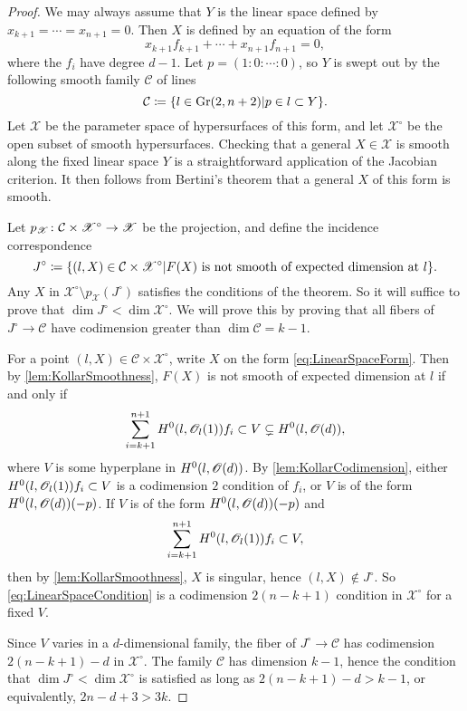 \begin{proof}
	We may always assume that $Y$ is the linear space defined by $x_{k+1} = \cdots = x_{n+1} = 0$. Then  $X$ is defined by an equation of the form 
	\begin{equation}
		\label{eq:LinearSpaceForm}
		x_{k+1}f_{k+1} + \cdots + x_{n+1}f_{n+1} = 0,
	\end{equation}
	where the $f_i$ have degree $d-1$. Let $p = (1:0:\cdots:0)$, so $Y$ is swept out by the following smooth family $\mathcal{C}$ of lines
	\[\mathcal{C} \coloneqq \lbrace l \in \operatorname{Gr}(2,n+2) \vert p \in l \subset Y\rbrace.\]
Let $\mathscr{X}$ be the parameter space of hypersurfaces of this form, and let $\mathscr{X}^\circ$ be the open subset of smooth hypersurfaces. Checking that a general $X \in \mathscr{X}$ is smooth along the fixed linear space $Y$ is a straightforward application of the Jacobian criterion. It then follows from Bertini's theorem that a general $X$ of this form is smooth.
	
	Let $p_{\mathscr{X}} \colon \mathcal{C} \times \mathscr{X}^\circ \to \mathscr{X}$ be the projection, and define the incidence correspondence
	\[J^\circ \coloneqq \lbrace(l,X) \in \mathcal{C} \times \mathscr{X}^\circ \vert F(X) \text{ is not smooth of expected dimension at } l\rbrace.\]
Any $X$ in $\mathscr{X}^\circ \setminus p_{\mathscr{X}}(J^\circ)$ satisfies the conditions of the theorem. So it will suffice to prove that $\dim J^\circ < \dim \mathscr{X}^\circ$. We will prove this by proving that all fibers of $J^\circ \to \mathcal{C}$ have codimension greater than $\dim \mathcal{C} = k-1$.

For a point $(l,X) \in {\mathcal{C}} \times \mathscr{X}^\circ$, write $X$ on the form \eqref{eq:LinearSpaceForm}. Then by \cref{lem:KollarSmoothness}, $F(X)$ is not smooth of expected dimension at $l$ if and only if
	\begin{equation}
		\label{eq:LinearSpaceCondition}
		\sum_{i=k+1}^{n+1}H^0(l,\mathscr{O}_l(1))f_i \subset V \subsetneq H^0(l,\mathscr{O}(d)),
	\end{equation}
	where $V$ is some hyperplane in $H^0(l,\mathscr{O}(d))$. By \cref{lem:KollarCodimension}, either $H^0(l,\mathscr{O}_l(1))f_i \subset V$ is a codimension $2$ condition of $f_i$, or $V$ is of the form $H^0(l,\mathscr{O}(d))(-p)$. If $V$ is of the form $H^0(l,\mathscr{O}(d))(-p)$ and 
	\[\sum_{i=k+1}^{n+1}H^0(l,\mathscr{O}_l(1))f_i \subset V,\]
	then by \cref{lem:KollarSmoothness}, $X$ is singular, hence $(l,X) \not\in J^\circ$. So \eqref{eq:LinearSpaceCondition} is a codimension $2(n-k+1)$ condition in $\mathscr{X}^\circ$ for a fixed $V$. 
	
	Since $V$ varies in a $d$-dimensional family, the fiber of $J^\circ \to \mathcal{C}$ has codimension $2(n-k+1)-d$ in $\mathscr{X}^\circ$. The family $\mathcal{C}$ has dimension $k-1$, hence the condition that $\dim J^\circ < \dim \mathscr{X}^\circ$ is satisfied as long as $2(n-k+1)-d > k-1$, or equivalently, $2n-d+3 > 3k$.
\end{proof}
